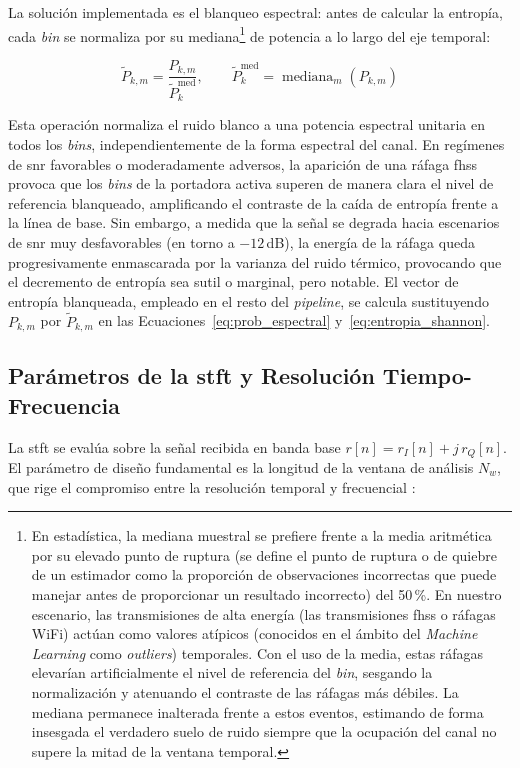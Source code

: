 La solución implementada es el blanqueo espectral: antes de calcular la entropía, cada \textit{bin} se normaliza por su mediana\footnote{En estadística, la mediana muestral se prefiere frente a la media aritmética por su elevado punto de ruptura (se define el punto de ruptura o de quiebre de un estimador como la proporción de observaciones incorrectas que puede manejar antes de proporcionar un resultado incorrecto) del 50\,\%. En nuestro escenario, las transmisiones de alta energía (las transmisiones \gls{fhss} o ráfagas WiFi) actúan como valores atípicos (conocidos en el ámbito del \textit{Machine Learning} como \textit{outliers}) temporales. Con el uso de la media, estas ráfagas elevarían artificialmente el nivel de referencia del \textit{bin}, sesgando la normalización y atenuando el contraste de las ráfagas más débiles. La mediana permanece inalterada frente a estos eventos, estimando de forma insesgada el verdadero suelo de ruido siempre que la ocupación del canal no supere la mitad de la ventana temporal.} de potencia a lo largo del eje temporal:

\begin{equation}
    \tilde{P}_{k,m} = \frac{P_{k,m}}{\tilde{P}_{k}^{\text{med}}}, \qquad \tilde{P}_{k}^{\text{med}} = \operatorname{mediana}_{m}\!\left(P_{k,m}\right)
    \label{eq:whitening}
\end{equation}

Esta operación normaliza el ruido blanco a una potencia espectral unitaria en todos los \textit{bins}, independientemente de la forma espectral del canal. En regímenes de \gls{snr} favorables o moderadamente adversos, la aparición de una ráfaga \gls{fhss} provoca que los \textit{bins} de la portadora activa superen de manera clara el nivel de referencia blanqueado, amplificando el contraste de la caída de entropía frente a la línea de base. Sin embargo, a medida que la señal se degrada hacia escenarios de \gls{snr} muy desfavorables (en torno a $-12$\,dB), la energía de la ráfaga queda progresivamente enmascarada por la varianza del ruido térmico, provocando que el decremento de entropía sea sutil o marginal, pero notable. El vector de entropía blanqueada, empleado en el resto del \textit{pipeline}, se calcula sustituyendo $P_{k,m}$ por $\tilde{P}_{k,m}$ en las Ecuaciones~\ref{eq:prob_espectral} y~\ref{eq:entropia_shannon}.

\subsection{Parámetros de la \gls{stft} y Resolución Tiempo-Frecuencia}
\label{subsec:parametros_stft}
La \gls{stft} se evalúa sobre la señal recibida en banda base $r[n] = r_I[n] + j\,r_Q[n]$. El parámetro de diseño fundamental es la longitud de la ventana de análisis $N_w$, que rige el compromiso entre la resolución temporal y frecuencial \cite{oppenheim_discrete_2014}:

